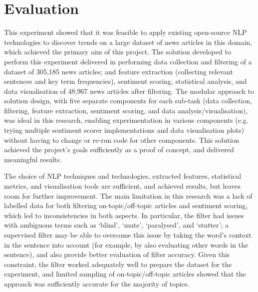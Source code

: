 \documentclass{report}
\begin{document}
\section{Evaluation} \label{Evaluation}

This experiment showed that it was feasible to apply existing open-source NLP technologies to discover trends on a large dataset of news articles in this domain, which achieved the primary aim of this project.
The solution developed to perform this experiment delivered in performing data collection and filtering of a dataset of 305,185 news articles; and feature extraction (collecting relevant sentences and key term frequencies), sentiment scoring, statistical analysis, and data visualisation of 48,967 news articles after filtering.
The modular approach to solution design, with five separate components for each sub-task (data collection, filtering, feature extraction, sentiment scoring, and data analysis/visualisation), was ideal in this research, enabling experimentation in various components (e.g. trying multiple sentiment scorer implementations and data visualisation plots) without having to change or re-run code for other components.
This solution achieved the project's goals sufficiently as a proof of concept, and delivered meaningful results.

The choice of NLP techniques and technologies, extracted features, statistical metrics, and visualisation tools are sufficient, and achieved results, but leaves room for further improvement.
The main limitation in this research was a lack of labelled data for both filtering on-topic/off-topic articles and sentiment scoring, which led to inconsistencies in both aspects.
In particular, the filter had issues with ambiguous terms such as `blind', `mute', `paralysed', and `stutter'; a supervised filter may be able to overcome this issue by taking the word's context in the sentence into account (for example, by also evaluating other words in the sentence), and also provide better evaluation of filter accuracy. 
Given this constraint, the filter worked adequately well to prepare the dataset for the experiment, and limited sampling of on-topic/off-topic articles showed that the approach was sufficiently accurate for the majority of topics.
\end{document}
